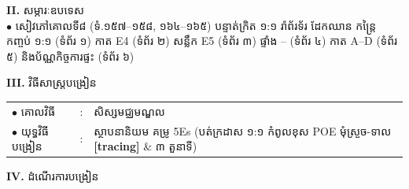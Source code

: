 \documentclass[a4paper,10pt]{article}
\newcommand{\cnum}[1]{{\fontsize{10.5pt}{12pt}\selectfont\ding{\numexpr181+#1\relax}}\hspace{0.2em}}
\begin{document}
{\vspace{2pt}

\textbf{II.} {\muol សម្ភារៈឧបទេស}\\[2pt]
\hspace*{0.55cm}$\bullet$ \hspace{0.35cm} សៀវភៅគោលទី៨ (ទំ.១៥៧--១៥៨, ១៦៤--១៦៥) បន្ទាត់ក្រិត ១:១ រ៉ាព័រទ័រ ដែកឈាន កន្ត្រៃ កញ្ចប់ ១:១ (ទំព័រ ១) កាត E4 (ទំព័រ ២) សន្លឹក E5 (ទំព័រ ៣) ផ្ទាំង \cnum{1}--\cnum{5} (ទំព័រ ៤) កាត A--D (ទំព័រ ៥) និងប័ណ្ណកិច្ចការផ្ទះ (ទំព័រ ៦)

\vspace{2pt}

\textbf{III.} {\muol វិធីសាស្រ្តបង្រៀន}\\[2pt]
\hspace*{0.55cm}%
\begin{tabular}{@{}l l l@{}}
  $\bullet$ \hspace{0.35cm} គោលវិធី & : \hspace{0.7cm} & សិស្សមជ្ឈមណ្ឌល \\
  $\bullet$ \hspace{0.35cm} យុទ្ធវិធីបង្រៀន & : & ស្ថាបនានិយម គម្រូ 5Es (បត់ក្រដាស ១:១ កំពូលខុស POE មុំស្រួច-ទាល \textbf{[tracing]} \& ៣ តួនាទី) \\
\end{tabular}
}

\vspace{2pt}

\textbf{IV.} {\muol ដំណើរការបង្រៀន}

\vspace{-3pt}
\end{document}
